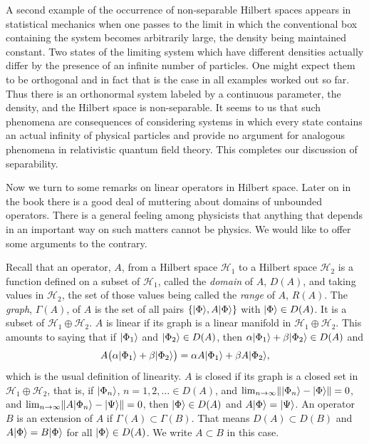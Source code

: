 A second example of the occurrence of non-separable Hilbert spaces appears
in statistical mechanics when one passes to the limit in which the
conventional box containing the system becomes arbitrarily large, the
density being maintained constant.  Two states of the limiting system which
have different densities actually differ by the presence of an infinite
number of particles.  One might expect them to be orthogonal and in fact that
is the case in all examples worked out so far.  Thus there is an orthonormal
system labeled by a continuous parameter, the density, and the Hilbert space
is non-separable.  It seems to us that such phenomena are consequences of
considering systems in which every state contains an actual infinity of
physical particles and provide no argument for analogous phenomena in
relativistic quantum field theory.  This completes our discussion of
separability.

Now we turn to some remarks on linear operators in Hilbert space.  Later on
in the book there is a good deal of muttering about domains of unbounded
operators.  There is a general feeling among physicists that anything that
depends in an important way on such matters cannot be physics.  We would
like to offer some arguments to the contrary.

Recall that an operator, $A$, from a Hilbert space $\mathcal{H}_1$ to a
Hilbert space $\mathcal{H}_2$ is a function defined on a subset of
$\mathcal{H}_1$, called the \emph{domain} of $A$, $D(A)$, and taking values
in $\mathcal{H}_2$, the set of those values being called the \emph{range} of
$A$, $R(A)$.  The \emph{graph}, $\Gamma(A)$, of $A$ is the set of all pairs
$\{\lvert \Phi\rangle,A\lvert \Phi\rangle\}$ with $\lvert \Phi\rangle\in D(A)$.  It is a subset of
$\mathcal{H}_1\oplus\mathcal{H}_2$.  $A$ is linear if its graph is a linear
manifold in $\mathcal{H}_1\oplus\mathcal{H}_2$.  This amounts to saying that
if $\lvert \Phi_1\rangle$ and $\lvert \Phi_2\rangle\in D(A)$, then
$\alpha\lvert \Phi_1\rangle+\beta\lvert \Phi_2\rangle\in D(A)$ and
\begin{equation*}
  A\bigl(\alpha\lvert \Phi_1\rangle+\beta\lvert \Phi_2\rangle\bigr)
  =\alpha A\lvert \Phi_1\rangle+\beta A\lvert \Phi_2\rangle,
\end{equation*}
which is the usual definition of linearity.  $A$ is closed if its graph is a
closed set in $\mathcal{H}_1\oplus\mathcal{H}_2$, that is, if
$\lvert \Phi_n\rangle$, $n=1,2,\ldots\in D(A)$, and
$\lim_{n\to\infty}\lVert\lvert \Phi_n\rangle-\lvert \Phi\rangle\rVert=0$, and
$\lim_{n\to\infty}\lVert A\lvert \Phi_n\rangle-\lvert \Psi\rangle\rVert=0$, then
$\lvert \Phi\rangle\in D(A)$ and $A\lvert \Phi\rangle=\lvert \Psi\rangle$.  An operator $B$ is an
extension of $A$ if $\Gamma(A)\subset\Gamma(B)$.  That means $D(A)\subset
D(B)$ and $A\lvert \Phi\rangle=B\lvert \Phi\rangle$ for all $\lvert \Phi\rangle\in D(A)$.  We write
$A\subset B$ in this case.

